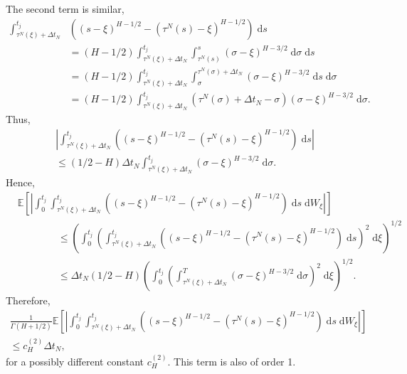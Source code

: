 \documentclass[reqno,12pt]{amsart}
\theoremstyle{plain} %
\theoremstyle{definition} %
\begin{document}
The second term is similar,
\begin{align*}
    \int_{\tau^N(\xi)+\Delta t_N}^{t_j} & \left( (s-\xi)^{H-1/2} - (\tau^N(s)-\xi)^{H-1/2}\right) \;\mathrm{d}s \\ 
    & = (H-1/2)\int_{\tau^N(\xi)+\Delta t_N}^{t_j} \int_{\tau^N(s)}^s (\sigma - \xi)^{H - 3/2} \;\mathrm{d}\sigma \;\mathrm{d}s \\
    & = (H-1/2)\int_{\tau^N(\xi)+\Delta t_N}^{t_j} \int_\sigma^{\tau^N(\sigma) + \Delta t_N} (\sigma - \xi)^{H - 3/2} \;\mathrm{d}s \;\mathrm{d}\sigma \\
    & = (H-1/2)\int_{\tau^N(\xi)+\Delta t_N}^{t_j} \left(\tau^N(\sigma) + \Delta t_N - \sigma\right) (\sigma - \xi)^{H - 3/2} \;\mathrm{d}\sigma.
\end{align*}
Thus,
\begin{multline*}
    \left| \int_{\tau^N(\xi)+\Delta t_N}^{t_j} \left( (s-\xi)^{H-1/2} - (\tau^N(s)-\xi)^{H-1/2}\right) \;\mathrm{d}s \right| \\
    \leq (1/2 - H)\Delta t_N \int_{\tau^N(\xi)+\Delta t_N}^{t_j} (\sigma - \xi)^{H - 3/2} \;\mathrm{d}\sigma.
\end{multline*}
Hence,
\begin{align*}
    & \mathbb{E}\left[\left|\int_{0}^{t_j} \int_{\tau^N(\xi)+\Delta t_N}^{t_j} \left( (s-\xi)^{H-1/2} - (\tau^N(s)-\xi)^{H-1/2}\right) \;\mathrm{d}s \;\mathrm{d}W_\xi\right|\right] \\
    & \qquad\qquad \leq \left(\int_{0}^{t_j} \left(\int_{\tau^N(\xi)+\Delta t_N}^{t_j} \left( (s-\xi)^{H-1/2} - (\tau^N(s)-\xi)^{H-1/2}\right) \;\mathrm{d}s \right)^2 \;\mathrm{d}\xi \right)^{1/2} \\
    & \qquad\qquad \leq \Delta t_N (1/2 - H)\left(\int_{0}^{t_j} \left( \int_{\tau^N(\xi)+\Delta t_N}^{T} (\sigma - \xi)^{H-3/2} \;\mathrm{d}\sigma \right)^2 \;\mathrm{d}\xi \right)^{1/2}.
\end{align*}
Therefore,
\begin{multline}
    \label{secondtermfBm}
    \frac{1}{\Gamma(H + 1/2)}\mathbb{E}\left[\left|\int_{0}^{t_j} \int_{\tau^N(\xi)+\Delta t_N}^{t_j} \left( (s-\xi)^{H-1/2} - (\tau^N(s)-\xi)^{H-1/2}\right)  \;\mathrm{d}s \;\mathrm{d}W_\xi\right|\right] \\
    \leq c_H^{(2)}\Delta t_N,
\end{multline}
for a possibly different constant $c_H^{(2)}$. This term is also of order 1.
\end{document}
